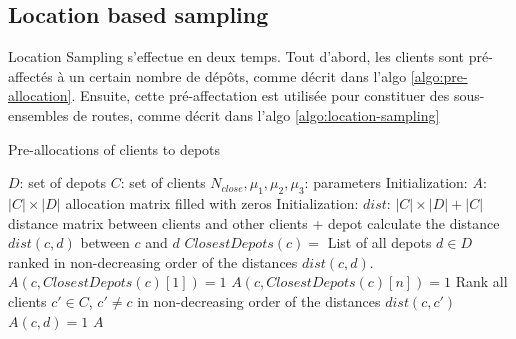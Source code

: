 \documentclass[a4paper,10pt]{article}
\begin{document}
\begin{linenumbers}
\subsection{Location based sampling}

Location Sampling s'effectue en deux temps. 
Tout d'abord, les clients sont pré-affectés à un certain nombre de dépôts, comme décrit dans l'algo \ref{algo:pre-allocation}.
Ensuite, cette pré-affectation est utilisée pour constituer des sous-ensembles de routes, comme décrit dans l'algo 	\ref{algo:location-sampling}


\begin{algorithm}
	\caption{Pre-allocations of clients to depots}
	\label{algo:pre-allocation}
	\begin{algorithmic}[1]
		\REQUIRE  $D$: set of depots
		\REQUIRE $C$: set of clients
		\REQUIRE $N_{close}, \mu_1, \mu_2, \mu_3$: parameters 
		\STATE
		\STATE Initialization: $A$: $|C| \times |D|$ allocation matrix filled with zeros
		\STATE Initialization: $dist$: $|C|\times|D|+|C|$ distance matrix between clients and other clients + depot
		\STATE
				\STATE calculate the distance $dist(c,d)$ between $c$ and $d$
			\ENDFOR
		\ENDFOR
		\STATE
			\STATE $ClosestDepots(c) = $ List of all depots $d \in D$ ranked in non-decreasing order of the distances $dist(c,d)$.
			\STATE 	$A(c,ClosestDepots(c)[1]) =1$ 	
					\STATE 	$A(c,ClosestDepots(c)[n]) =1$ 	
				\ENDIF
			\ENDFOR
		\ENDFOR
		\STATE
			\STATE Rank all clients $c' \in C$, $c' \neq c$ in non-decreasing order of the distances $dist(c,c')$ 
							\STATE $A(c,d) =1$
						\ENDIF
					\ENDFOR
				\ENDIF
			\ENDFOR
		\ENDFOR
		\RETURN $A$
	\end{algorithmic}
\end{algorithm}






\end{linenumbers}
\end{document}
